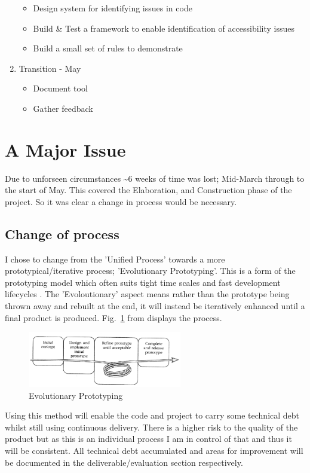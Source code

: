 \begin{enumerate}
    \begin{itemize}
      \item Design system for identifying issues in code
      \item Build \& Test a framework to enable identification of accessibility
      issues
      \item Build a small set of rules to demonstrate
    \end{itemize}
  \item {Transition - May}
     \begin{itemize}
        \item Document tool
        \item Gather feedback
     \end{itemize}
\end {enumerate}

\section{A Major Issue}
Due to unforseen circumstances \textasciitilde6 weeks of time was lost;
Mid-March through to the start of May. This covered the Elaboration, and
Construction phase of the project. So it was clear a change in process would be
necessary.

\subsection{Change of process}
I chose to change from the 'Unified Process' towards a more
prototypical/iterative process; 'Evolutionary Prototyping'. This is a form of
the prototyping model which often suits tight time scales and fast development
lifecycles \citep{EvoProto}. The 'Evoloutionary' aspect means rather than the
prototype being thrown away and rebuilt at the end, it will instead be
iteratively enhanced until a final product is produced. Fig.~\ref{fig:proto}
from \citep{EvoProto2} displays the process.

\begin{figure}[H]
\centering
\includegraphics[width=0.6\textwidth]{figures/prototyping}
\captionsetup{justification=centering}
\caption{Evolutionary Prototyping
\label{fig:proto}}
\end{figure}

Using this method will enable the code and project to carry some technical debt
whilst still using continuous delivery. There is a higher
risk to the quality of the product but as this is an individual process I am in
control of that and thus it will be consistent. All technical debt
accumulated and areas for improvement will be documented in the
deliverable/evaluation section respectively.

